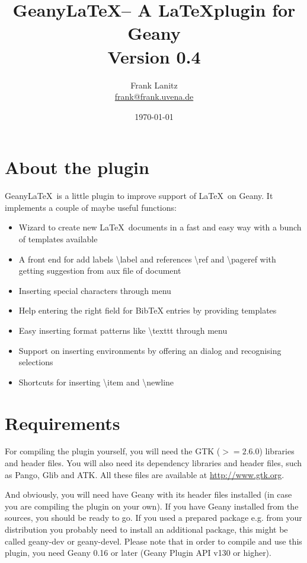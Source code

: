 \documentclass[%
a4paper,%
10pt,%
oneside,%
DIV18,
headsepline,
plainheadsepline,
footsepline,
plainfootsepline,
bibtotoc,%
liststotoc,%
BCOR12mm,%
halfparskip,%
openany,%
]{scrartcl}
\title{Geany\LaTeX -- A \LaTeX plugin for Geany \\[1.5ex]
	   \normalsize Version 0.4}
\author{Frank Lanitz \\ \small{\href{mailto:frank@frank.uvena.de}{frank@frank.uvena.de}}}
\date{\today}
\begin{document}
\maketitle
\tableofcontents
\newpage
{}
\section{About the plugin}

Geany\LaTeX\ is a little plugin to improve support of \LaTeX\ on Geany.
It implements a couple of maybe useful functions:

\begin{itemize}
	\item Wizard to create new \LaTeX\ documents in a fast and easy way
	 	  with a bunch of templates available
	\item A front end for add labels \textbackslash label{} and
		  references \textbackslash ref{} and \textbackslash pageref{}
   		  with getting suggestion from aux file of document
	\item Inserting special characters through menu
	\item Help entering the right field for BibTeX entries by
		  providing templates
	\item Easy inserting format patterns like \textbackslash texttt{}
		  through menu
	\item Support on inserting environments by offering an dialog and
		  recognising selections
	\item Shortcuts for inserting \textbackslash item and
		  \textbackslash newline
\end{itemize}


\section{Requirements}

For compiling the plugin yourself, you will need the GTK ($>= 2.6.0$)
libraries and header files. You will also need its dependency
libraries and header files, such as Pango, Glib and ATK. All these
files are available at \url{http://www.gtk.org}.

And obviously, you will need have Geany with its header files
installed (in case you are compiling the plugin on your own). If you
have Geany installed from the sources, you should be ready to go. If
you used a prepared package e.g. from your distribution you probably
need to install an additional package, this might be called geany-dev
or geany-devel. Please note that in order to compile and use this
plugin, you need Geany 0.16 or later (Geany Plugin API v130 or higher).
\end{document}
